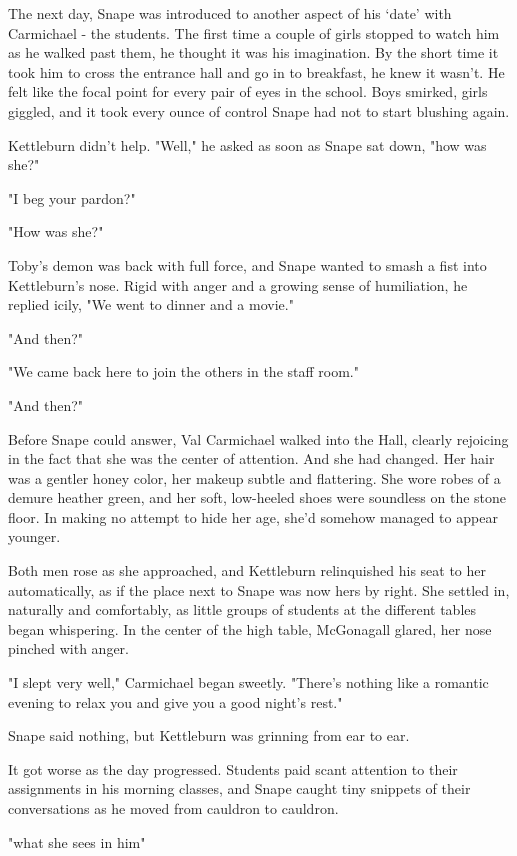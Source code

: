 The next day, Snape was introduced to another aspect of his `date' with Carmichael - the students. The first time a couple of girls stopped to watch him as he walked past them, he thought it was his imagination. By the short time it took him to cross the entrance hall and go in to breakfast, he knew it wasn't. He felt like the focal point for every pair of eyes in the school. Boys smirked, girls giggled, and it took every ounce of control Snape had not to start blushing again.

Kettleburn didn't help. "Well," he asked as soon as Snape sat down, "how was she?"

"I beg your pardon?"

"How was she?"

Toby's demon was back with full force, and Snape wanted to smash a fist into Kettleburn's nose. Rigid with anger and a growing sense of humiliation, he replied icily, "We went to dinner and a movie."

"And then?"

"We came back here to join the others in the staff room."

"And then?"

Before Snape could answer, Val Carmichael walked into the Hall, clearly rejoicing in the fact that she was the center of attention. And she had changed. Her hair was a gentler honey color, her makeup subtle and flattering. She wore robes of a demure heather green, and her soft, low-heeled shoes were soundless on the stone floor. In making no attempt to hide her age, she'd somehow managed to appear younger.

Both men rose as she approached, and Kettleburn relinquished his seat to her automatically, as if the place next to Snape was now hers by right. She settled in, naturally and comfortably, as little groups of students at the different tables began whispering. In the center of the high table, McGonagall glared, her nose pinched with anger.

"I slept very well," Carmichael began sweetly. "There's nothing like a romantic evening to relax you and give you a good night's rest."

Snape said nothing, but Kettleburn was grinning from ear to ear.

It got worse as the day progressed. Students paid scant attention to their assignments in his morning classes, and Snape caught tiny snippets of their conversations as he moved from cauldron to cauldron.

"{\el}what she sees in him{\el}"

